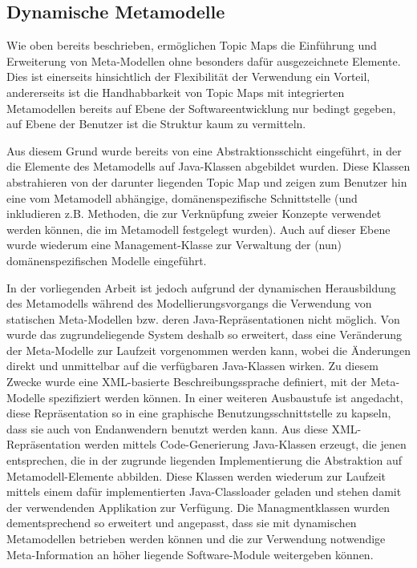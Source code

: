 \subsection{Dynamische Metamodelle}
\label{sec:dynamische_metamodelle}

Wie oben bereits beschrieben, ermöglichen Topic Maps die Einführung und Erweiterung von Meta-Modellen ohne besonders dafür ausgezeichnete Elemente. Dies ist einerseits hinsichtlich der Flexibilität der Verwendung ein Vorteil, andererseits ist die Handhabbarkeit von Topic Maps mit integrierten Metamodellen bereits auf Ebene der Softwareentwicklung nur bedingt gegeben, auf Ebene der Benutzer ist die Struktur kaum zu vermitteln.

Aus diesem Grund wurde bereits von \citep{Oppl07} eine Abstraktionsschicht eingeführt, in der die Elemente des Metamodells auf Java-Klassen abgebildet wurden. Diese Klassen abstrahieren von der darunter liegenden Topic Map und zeigen zum Benutzer hin eine vom Metamodell abhängige, domänenspezifische Schnittstelle (und inkludieren z.B. Methoden, die zur Verknüpfung zweier Konzepte verwendet werden können, die im Metamodell festgelegt wurden). Auch auf dieser Ebene wurde wiederum eine Management-Klasse zur Verwaltung der (nun) domänenspezifischen Modelle eingeführt.
 
In der vorliegenden Arbeit ist jedoch aufgrund der dynamischen Herausbildung des Metamodells während des Modellierungsvorgangs die Verwendung von statischen Meta-Modellen bzw. deren Java-Repräsentationen nicht möglich. Von \citet{Neubauer08} wurde das zugrundeliegende System deshalb so erweitert, dass eine Veränderung der Meta-Modelle zur Laufzeit vorgenommen werden kann, wobei die Änderungen direkt und unmittelbar auf die verfügbaren Java-Klassen wirken. Zu diesem Zwecke wurde eine \gls{XML}-basierte Beschreibungssprache definiert, mit der Meta-Modelle spezifiziert werden können. In einer weiteren Ausbaustufe ist angedacht, diese Repräsentation so in eine graphische Benutzungsschnittstelle zu kapseln, dass sie auch von Endanwendern benutzt werden kann. Aus diese \gls{XML}-Repräsentation werden mittels Code-Generierung Java-Klassen erzeugt, die jenen entsprechen, die in der zugrunde liegenden Implementierung die Abstraktion auf Metamodell-Elemente abbilden. Diese Klassen werden wiederum zur Laufzeit mittels einem dafür implementierten Java-Classloader geladen und stehen damit der verwendenden Applikation zur Verfügung. Die Managmentklassen wurden dementsprechend so erweitert und angepasst, dass sie mit dynamischen Metamodellen betrieben werden können und die zur Verwendung notwendige Meta-Information an höher liegende Software-Module weitergeben können.  

